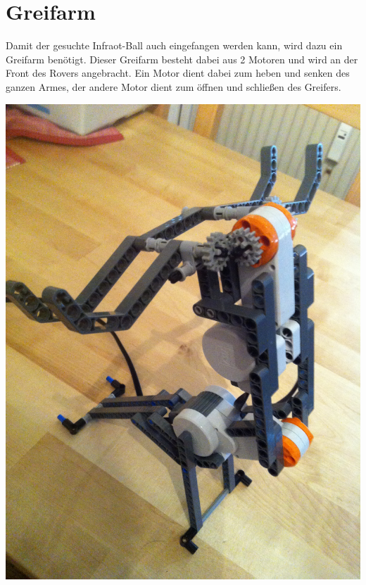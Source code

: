 \section{Greifarm}

Damit der gesuchte Infraot-Ball auch eingefangen werden kann, wird dazu ein Greifarm benötigt. Dieser Greifarm besteht dabei aus 2 Motoren und wird an der Front des Rovers angebracht. Ein Motor dient dabei zum heben und senken des ganzen Armes, der andere Motor dient zum öffnen und schließen des Greifers.

\begin{capfigure}[Greifarm]
	\includegraphics[width=\textwidth]{images/construction/greifarm/Greifarm1}
\end{capfigure}